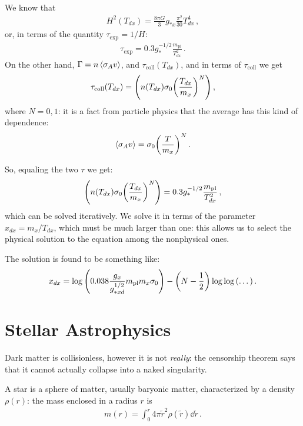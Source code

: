 \documentclass[main.tex]{subfiles}
\begin{document}
We know that 
%
\begin{align}
  H^2 (T_{dx}) = \frac{8 \pi G}{3} g_{*x} \frac{\pi^2}{30} T_{dx}^{4}
\,,
\end{align}
%
or, in terms of the quantity \(\tau_{\text{exp}}= 1/H\):
%
\begin{align}
  \tau_{\text{exp}} = 0.3 g_{*}^{-1/2} \frac{m _{\text{pl}}}{T_{dx}^2}
\,.
\end{align}
%
On the other hand, \(\Gamma = n \expval{\sigma _A v}\), and \(\tau _{\text{coll}} ( T_{dx})\), and in terms of \(\tau _{\text{coll}}\) we get 
%
\begin{align}
  \tau _{\text{coll}} (T_{dx}) = \qty(n(T_{dx}) \sigma _0 \qty(\frac{T_{dx}}{m_x})^{N})
\,,
\end{align}
%
where \(N = 0,1\): it is a fact from particle physics that the average has this kind of dependence: 
%
\begin{align}
  \expval{\sigma _A v} = \sigma_0 \qty(\frac{T}{m_x})^{N}
\,.
\end{align}

So, equaling the two \(\tau \) we get: 
%
\begin{align}
\qty(n(T_{dx}) \sigma _0 \qty(\frac{T_{dx}}{m_x})^{N})= 0.3 g_{*}^{-1/2} \frac{m _{\text{pl}}}{T_{dx}^2}
\,,
\end{align}
%
which can be solved iteratively. We solve it in terms of the parameter \(x_{dx} = m_x / T_{dx}\), which must be much larger than one: this allows us to select the physical solution to the equation among the nonphysical ones. 

The solution is found to be something like: 
%
\begin{align}
  x_{dx} = \log \qty(\num{.038} \frac{g_{x}}{g_{*xd}^{1/2}} m _{\text{pl}}  m_x \sigma_0 ) - \qty(N - \frac{1}{2}) \log \log \qty(\dots)
\,. 
\end{align}
%

\section{Stellar Astrophysics}

Dark matter is collisionless, however it is not \emph{really}: the censorship theorem says that it cannot actually collapse into a naked singularity. 

A star is a sphere of matter, usually baryonic matter, characterized by a density \(\rho (r)\): the mass enclosed in a radius \(r\) is 
%
\begin{align}
  m(r) = \int_{0}^{r} 4 \pi \widetilde{r}^2 \rho (\widetilde{r}) \dd{\widetilde{r}}
\,.
\end{align}
\end{document}
